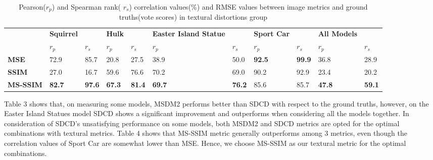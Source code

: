 \begin{table}[]
\centering
\caption{Pearson($r_p$) and Spearman rank( $r_s$) correlation values(\%) and RMSE values between image metrics and ground truths(vote scores) in textural distortions group}
\label{my-label}
\begin{tabular}{lllllllllll}
                & \textbf{Squirrel} & \textbf{} & \textbf{Hulk} & \textbf{} & \textbf{Easter Island Statue} & \textbf{} & \textbf{Sport Car} & \textbf{} & \textbf{All Models} &      \\
                & $r_p$        & $r_s$        & $r_p$            & $r_s$        & $r_p$               & $r_s$        & $r_p$                & $r_s$       & $r_p$                  & $r_s$   \\
\textbf{MSE}    & 72.9              & 85.7          & 20.8  & 27.5          & 38.9                          & 50.0          & \textbf{92.5}      & \textbf{99.9} & 36.8                & 28.9          \\
\textbf{SSIM} \cite{Wang_2004}  & 27.0              & 16.7          & 59.6          & 76.6          & 70.2                          & 69.0          & 90.2               & 92.9          & 23.4                & 20.2          \\
\textbf{MS-SSIM} \cite{Wang} & \textbf{82.7}     & \textbf{97.6} & \textbf{67.3}          & \textbf{81.4} & \textbf{69.7}                 & \textbf{76.2} & 85.6               & 85.7          & \textbf{47.8}       & \textbf{59.1}
\end{tabular}
\end{table}
Table 3 shows that, on measuring some models, MSDM2 performs better than SDCD with respect to the ground truths, however, on the Easter Island Statues model SDCD shows a significant improvement and outperforms when considering all the models together. In consideration of SDCD’s unsatisfying performance on some models, both MSDM2 and SDCD metrics are opted for the optimal combinations with textural metrics. Table 4 shows that MS-SSIM metric generally outperforms among 3 metrics, even though the correlation values of Sport Car are somewhat lower than MSE.  Hence, we choose MS-SSIM as our textural metric for the optimal combinations.\\
